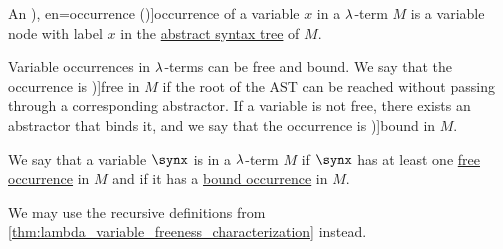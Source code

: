 \begin{definition}\label{def:lambda_variable_occurrence}\mimprovised
  An \term[ru=вхождение (\cite[64]{Герасимов2011Вычислимость}), en=occurrence (\cite[9A2]{Hindley1997BasicSTT})]{occurrence} of a variable \( x \) in a \( {\mathrm \lambda} \)-term \( M \) is a variable node with label \( x \) in the \hyperref[def:lambda_term_ast]{abstract syntax tree} of \( M \).

  Variable occurrences in \( {\mathrm \lambda} \)-terms can be free and bound. We say that the occurrence is \term[ru=свободное (вхождение) (\cite[64]{Герасимов2011Вычислимость})]{free} in \( M \) if the root of the AST can be reached without passing through a corresponding abstractor. If a variable is not free, there exists an abstractor that binds it, and we say that the occurrence is \term[ru=связанное (вхождение) (\cite[64]{Герасимов2011Вычислимость})]{bound} in \( M \).
\end{definition}

\begin{definition}\label{def:lambda_variable_freeness}
  We say that a variable \( \synx \) is  in a \( {\mathrm \lambda} \)-term \( M \) if \( \synx \) has at least one \hyperref[def:lambda_variable_occurrence]{free occurrence} in \( M \) and  if it has a \hyperref[def:lambda_variable_occurrence]{bound occurrence} in \( M \).
\end{definition}
\begin{comments}
  \item We may use the recursive definitions from \cref{thm:lambda_variable_freeness_characterization} instead.
\end{comments}

